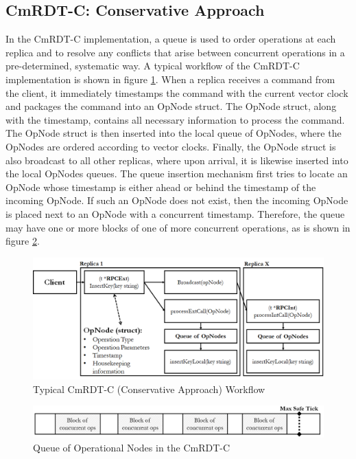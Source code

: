 \documentclass[sigconf,nonacm,11pt]{acmart}
\begin{document}
\subsection{CmRDT-C: Conservative Approach}
In the CmRDT-C implementation, a queue is used to order operations at each replica and to resolve any conflicts that arise between concurrent operations in a pre-determined, systematic way. A typical workflow of the CmRDT-C implementation is shown in figure \ref{fig:cmrdtq1}. When a replica receives a command from the client, it immediately timestamps the command with the current vector clock and packages the command into an OpNode struct. The OpNode struct, along with the timestamp, contains all necessary information to process the command. The OpNode struct is then inserted into the local queue of OpNodes, where the OpNodes are ordered according to vector clocks. Finally, the OpNode struct is also broadcast to all other replicas, where upon arrival, it is likewise inserted into the local OpNodes queues. The queue insertion mechanism first tries to locate an OpNode whose timestamp is either ahead or behind the timestamp of the incoming OpNode. If such an OpNode does not exist, then the incoming OpNode is placed next to an OpNode with a concurrent timestamp. Therefore, the queue may have one or more blocks of one of more concurrent operations, as is shown in figure \ref{fig:cmrdtq2}.

\begin{figure}[h]
  \centering
  \includegraphics[width=15.5cm]{Fig5CmRDTQ1}
  \caption{Typical CmRDT-C (Conservative Approach) Workflow}
  \label{fig:cmrdtq1}
\end{figure}

\begin{figure}[h]
  \centering
  \includegraphics[width=15.5cm]{Fig6CmRDTQ2}
  \caption{Queue of Operational Nodes in the CmRDT-C}
  \label{fig:cmrdtq2}
\end{figure}
\end{document}
